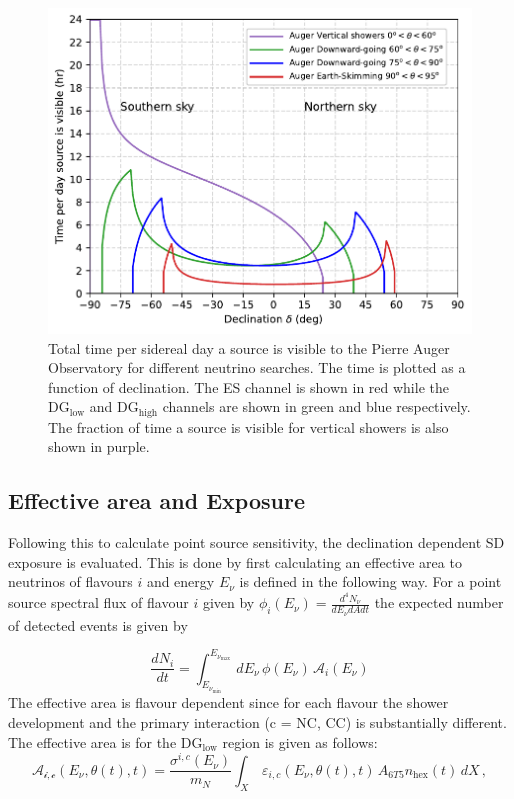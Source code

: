 \begin{figure}[t!]
  \centering
  \includegraphics[width=14.5cm]{thesis_figures/PointLimits/Time_per_day.pdf}
  \caption{Total time per sidereal day a source is visible to the Pierre Auger Observatory for different neutrino searches. The time is plotted as a function of declination. The ES channel is shown in red while the DG$\mathrm{_{\text{low}}}$ and DG$\mathrm{_{\text{high}}}$ channels are shown in green and blue respectively. The fraction of time a source is visible for vertical showers is also shown in purple.}
  \label{fig:time_per_day}
\end{figure}

\subsection{Effective area and Exposure}
\label{subsec:psource_area}
Following this to calculate point source sensitivity, the declination dependent SD exposure is evaluated. This is done by first calculating an effective area to neutrinos of flavours $i$ and energy $E_{\nu}$ is defined in the following way. For a point source spectral flux of flavour $i$ given by $\phi_i(E_{\nu}) = \frac{d^4 N_{\nu}}{dE_{\nu} dA dt}$ the expected number of detected events is given by 

\begin{equation}
  \label{eq:expected_events_point}
  \frac{dN_{i}}{dt} = \int_{E_{\nu_{\text{min}}}}^{E_{\nu_{\text{max}}}} \, dE_{\nu} \, \phi(E_{\nu}) \, \mathcal{A}_i(E_{\nu})
\end{equation}
The effective area is flavour dependent since for each flavour the shower development and the primary interaction (c = NC, CC) is substantially different. The effective area is for the DG$\mathrm{_{\text{low}}}$ region is given as follows:
\begin{equation}
  \label{eq:effective_area}
  \mathcal{A_{i,c}}(E_{\nu},\theta(t),t) = \frac{\sigma^{i,c}(E_{\nu})}{m_N} \int_{X} \, \varepsilon_{i,c}(E_{\nu},\theta(t),t) \, A_{6T5} n_{\text{hex}}(t) \, dX \, ,
\end{equation}

